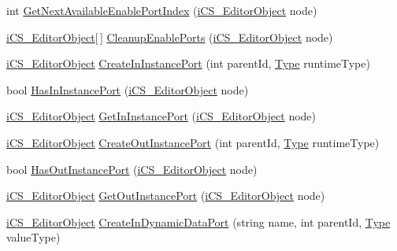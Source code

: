 \begin{DoxyCompactItemize}
\item 
int \hyperlink{classi_c_s___i_storage_a0c9daad31dadb8192bbca594aa04d73b}{Get\+Next\+Available\+Enable\+Port\+Index} (\hyperlink{classi_c_s___editor_object}{i\+C\+S\+\_\+\+Editor\+Object} node)
\item 
\hyperlink{classi_c_s___editor_object}{i\+C\+S\+\_\+\+Editor\+Object}\mbox{[}$\,$\mbox{]} \hyperlink{classi_c_s___i_storage_a662bafbbf8849bb99f6cad9e1307f96f}{Cleanup\+Enable\+Ports} (\hyperlink{classi_c_s___editor_object}{i\+C\+S\+\_\+\+Editor\+Object} node)
\item 
\hyperlink{classi_c_s___editor_object}{i\+C\+S\+\_\+\+Editor\+Object} \hyperlink{classi_c_s___i_storage_a4d12e766e5329e78e8a5b2063976e108}{Create\+In\+Instance\+Port} (int parent\+Id, \hyperlink{i_c_s___object_type_enum_8cs_ae6c3dd6d8597380b56d94908eb431547aa1fa27779242b4902f7ae3bdd5c6d508}{Type} runtime\+Type)
\item 
bool \hyperlink{classi_c_s___i_storage_a8e8f70d2790f90ea4a0d0df3c7f00b20}{Has\+In\+Instance\+Port} (\hyperlink{classi_c_s___editor_object}{i\+C\+S\+\_\+\+Editor\+Object} node)
\item 
\hyperlink{classi_c_s___editor_object}{i\+C\+S\+\_\+\+Editor\+Object} \hyperlink{classi_c_s___i_storage_a4c407cdbabb8b020a0a413300a87ac2c}{Get\+In\+Instance\+Port} (\hyperlink{classi_c_s___editor_object}{i\+C\+S\+\_\+\+Editor\+Object} node)
\item 
\hyperlink{classi_c_s___editor_object}{i\+C\+S\+\_\+\+Editor\+Object} \hyperlink{classi_c_s___i_storage_a41284a92f4128cdde06d3b0538278e4a}{Create\+Out\+Instance\+Port} (int parent\+Id, \hyperlink{i_c_s___object_type_enum_8cs_ae6c3dd6d8597380b56d94908eb431547aa1fa27779242b4902f7ae3bdd5c6d508}{Type} runtime\+Type)
\item 
bool \hyperlink{classi_c_s___i_storage_a0cbf865f814b512f8f57604ab47c0260}{Has\+Out\+Instance\+Port} (\hyperlink{classi_c_s___editor_object}{i\+C\+S\+\_\+\+Editor\+Object} node)
\item 
\hyperlink{classi_c_s___editor_object}{i\+C\+S\+\_\+\+Editor\+Object} \hyperlink{classi_c_s___i_storage_a7c3c37bd391bcd91ae9899b4718523e7}{Get\+Out\+Instance\+Port} (\hyperlink{classi_c_s___editor_object}{i\+C\+S\+\_\+\+Editor\+Object} node)
\item 
\hyperlink{classi_c_s___editor_object}{i\+C\+S\+\_\+\+Editor\+Object} \hyperlink{classi_c_s___i_storage_af14f2d1bc3e49f19ee99d01ef9f4123d}{Create\+In\+Dynamic\+Data\+Port} (string name, int parent\+Id, \hyperlink{i_c_s___object_type_enum_8cs_ae6c3dd6d8597380b56d94908eb431547aa1fa27779242b4902f7ae3bdd5c6d508}{Type} value\+Type)

\end{DoxyCompactItemize}
